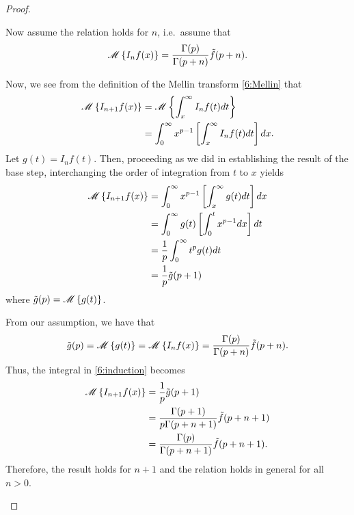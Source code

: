 \begin{proof}
\begin{enumerate}
      Now assume the relation holds for $n$, i.e.\ assume that
      \begin{align*}
        \mathscr{M}\left\{ {I_n f(x)} \right\} = \frac{\Gamma(p)}{\Gamma(p+n)} \tilde{f}(p + n).
      \end{align*}

      Now, we see from the definition of the Mellin transform \eqref{6:Mellin} that
      \begin{align*}
        \mathscr{M}\left\{ {I_{n+1} f(x)} \right\} &= \mathscr{M}\left\{ {\int_x^\infty I_n f(t) dt} \right\} \\
        &= \int_0^\infty x^{p-1} \left[\int_x^\infty I_n f(t) dt \right] dx.
      \end{align*}
      Let $g(t) = I_n f(t)$. Then, proceeding as we did in establishing the result of
      the base step, interchanging the order of integration
      from $t$ to $x$ yields
      \begin{align}
        \label{6:induction}
        \mathscr{M}\left\{ {I_{n+1} f(x)} \right\}
        &= \int_0^\infty x^{p-1} \left[\int_x^\infty g(t) dt \right] dx \notag \\
        &= \int_0^\infty g(t)  \left[\int_0^t x^{p-1}dx \right] dt \notag \\
        &= \frac{1}{p}\int_0^\infty t^p g(t)dt \notag \\
        &= \frac{1}{p}\tilde{g}(p + 1)
      \end{align}
      where $\tilde{g}(p) = \mathscr{M}\left\{ {g(t)} \right\}$.

      From our assumption, we have that
      \begin{align*}
        \tilde{g}(p) = \mathscr{M}\left\{ {g(t)} \right\} = \mathscr{M}\left\{ {I_n f(x)} \right\} = \frac{\Gamma(p)}{\Gamma(p+n)} \tilde{f}(p + n).
      \end{align*}
      Thus, the integral in \eqref{6:induction} becomes
      \begin{align*}
        \mathscr{M}\left\{ {I_{n+1} f(x)} \right\}
        &= \frac{1}{p}\tilde{g}(p + 1) \\
        &= \frac{\Gamma(p+1)}{p\Gamma(p+n+1)} \tilde{f}(p + n + 1) \\
        &= \frac{\Gamma(p)}{\Gamma(p+n+1)} \tilde{f}(p + n + 1).
      \end{align*}
      Therefore, the result holds for $n+1$ and the relation holds in general for all $n > 0$.

  \end{enumerate}
\end{proof}
\newpage
